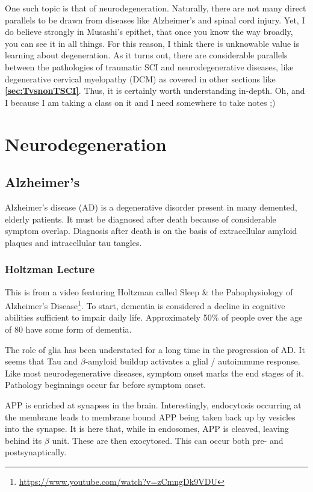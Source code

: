\documentclass[12pt]{report}
\begin{document}
One such topic is that of neurodegeneration. Naturally, there are not many direct parallels to be drawn from diseases like Alzheimer's and spinal cord injury. Yet, I do believe strongly in Musashi's epithet, that once you know the way broadly, you can see it in all things. For this reason, I think there is unknowable value is learning about degeneration. As it turns out, there are considerable parallels between the pathologies of traumatic SCI and neurodegenerative diseases, like degenerative cervical myelopathy (DCM) as covered in other sections like \textbf{\ref{sec:TvsnonTSCI}}. Thus, it is certainly worth understanding in-depth. Oh, and I because I am taking a class on it and I need somewhere to take notes ;) 

\chapter*{Neurodegeneration}

\section*{Alzheimer's}

Alzheimer's disease (AD) is a degenerative disorder present in many demented, elderly patients. It must be diagnosed after death because of considerable symptom overlap. Diagnosis after death is on the basis of extracellular amyloid plaques and intracellular tau tangles. 

\subsection*{Holtzman Lecture} This is from a video featuring Holtzman called Sleep \& the Pahophysiology of Alzheimer's Disease\footnote{\url{https://www.youtube.com/watch?v=zCmngDk9VDU}}. To start, dementia is considered a decline in cognitive abilities sufficient to impair daily life. Approximately 50\% of people over the age of 80 have some form of dementia.\newline

The role of glia has been understated for a long time in the progression of AD. It seems that Tau and $\beta$-amyloid buildup activates a glial / autoimmune response. Like most neurodegenerative diseases, symptom onset marks the end stages of it. Pathology beginnings occur far before symptom onset.\newline

APP is enriched at synapses in the brain. Interestingly, endocytosis occurring at the membrane leads to membrane bound APP being taken back up by vesicles into the synapse. It is here that, while in endosomes, APP is cleaved, leaving behind its $\beta$ unit. These are then exocytosed. This can occur both pre- and postsynaptically.\newline
\end{document}
